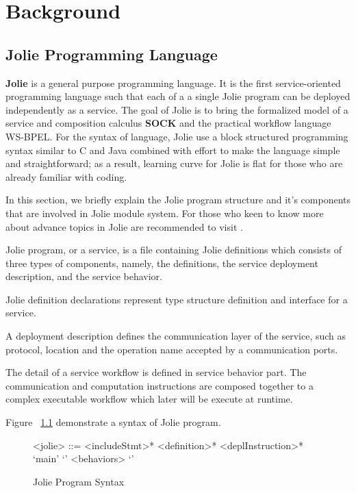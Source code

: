 \chapter{Background}

\section{Jolie Programming Language}

\textbf{Jolie}\cite{JOLIE} is a general purpose programming language.
It is the first service-oriented programming language such that each of a a single Jolie program can be deployed independently as a service.
The goal of Jolie is to bring the formalized model of a service and composition calculus \textbf{SOCK} \cite{10.1007/11948148-27} and the practical workflow language WS-BPEL\cite{OASIS}.
For the syntax of language, Jolie use a block structured programming syntax similar to C and Java combined with effort to make the language simple and straightforward; as a result, learning curve for Jolie is flat for those who are already familiar with coding.

In this section, we briefly explain the Jolie program structure and it's components that are involved in Jolie module system. For those who keen to know more about advance topics in Jolie are recommended to visit \cite{joliedoc, JOLIE}.

Jolie program, or a service, is a file containing Jolie definitions which consists of three types of components, namely, the definitions, the service deployment description, and the service behavior.

Jolie definition declarations represent type structure definition and interface for a service.

A deployment description defines the communication layer of the service, such as protocol, location and the operation name accepted by a communication ports.

The detail of a service workflow is defined in service behavior part. The communication and computation instructions are composed together to a complex executable workflow which later will be execute at runtime. 

Figure ~\ref{fig:JolieGrammar} demonstrate a syntax of Jolie program.

\begin{figure}[h]
    \begin{framed}
        \begin{grammar}
            <jolie> ::= <includeStmt>* <definition>* <deplInstruction>*  `main' `{' <behaviors> `}'
        \end{grammar}
    \end{framed}
    \caption{Jolie Program Syntax}
    \label{fig:JolieGrammar}
\end{figure}

